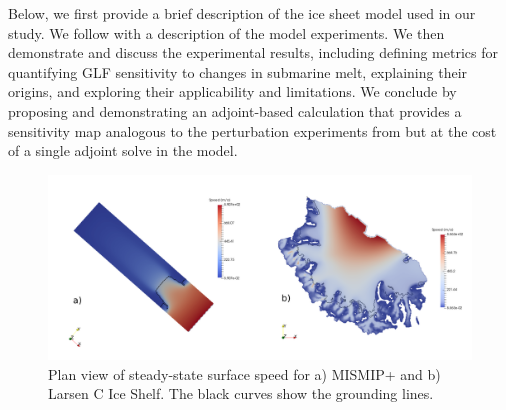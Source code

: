 \documentclass[review,oneside]{igs}
\begin{document}

Below, we first provide a brief description of the ice sheet model used in our study. We follow with a description of the model experiments. We then demonstrate and discuss the experimental results, including defining metrics for quantifying GLF sensitivity to changes in submarine melt, explaining their origins, and exploring their applicability and limitations.  We conclude by proposing and demonstrating an adjoint-based calculation that provides a sensitivity map analogous to the perturbation experiments from \citet{reese2018} but at the cost of a single adjoint solve in the model. 


\begin{figure}
\centering
\includegraphics[width=1\linewidth]{figs/mismip+_larsenC.pdf}
\caption{Plan view of steady-state surface speed for a) MISMIP+ and b) Larsen C Ice Shelf. The black curves show the grounding lines.}
\label{mismip+_larsenC}
\end{figure}
\end{document}
